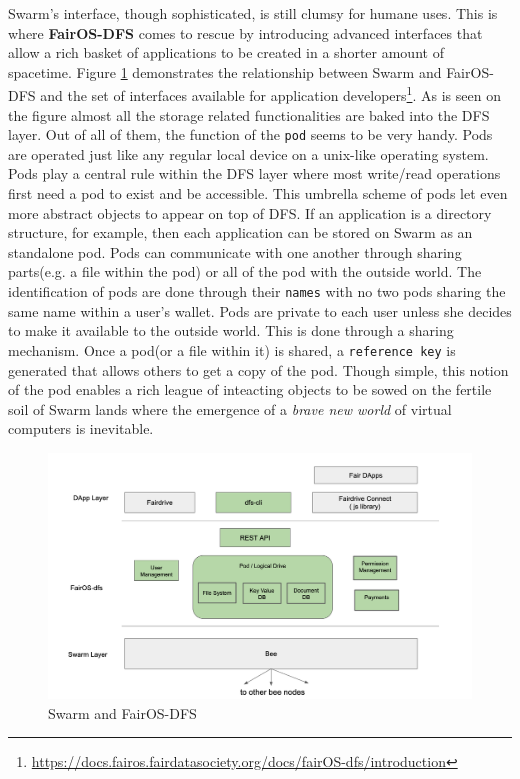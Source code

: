 \documentclass[a4paper, 10pt]{article}
\begin{document}
Swarm's interface, though sophisticated, is still clumsy for humane uses. This is where \textbf{FairOS-DFS} comes to rescue by introducing advanced interfaces that allow a rich basket of applications to be created in a shorter amount of spacetime. Figure  \ref{swarmfair} demonstrates the relationship between Swarm and FairOS-DFS and the set of interfaces available for application developers\footnote{\url{https://docs.fairos.fairdatasociety.org/docs/fairOS-dfs/introduction}}. As is seen on the figure almost all the storage related functionalities are baked into the DFS layer. Out of all of them, the function of the \texttt{pod} seems to be very handy. Pods are operated just like any regular local device on a unix-like operating system. Pods play a central rule within the DFS layer where most write/read operations first need a pod to exist and be accessible. This umbrella scheme of pods let even more abstract objects to appear on top of DFS. If an application is a directory structure, for example, then each application can be stored on Swarm as an standalone pod. Pods can communicate with one another through sharing parts(e.g. a file within the pod) or all of the pod with the outside world. The identification of pods are done through their \texttt{names} with no two pods sharing the same name within a user's wallet. Pods are private to each user unless she decides to make it available to the outside world. This is done through a sharing mechanism. Once a pod(or a file within it) is shared, a \texttt{reference key} is generated that allows others to get a copy of the pod. Though simple, this notion of the pod enables a rich league of inteacting objects to be sowed on the fertile soil of Swarm lands where the emergence of a \textit{brave new world} of virtual computers is inevitable.

\begin{figure}
\includegraphics[scale=0.3,keepaspectratio=true]{images/swarm-fair.png}
\caption{\label{swarmfair}Swarm and \textcolor{fairgreen}{FairOS-DFS}}
\end{figure}
\end{document}

